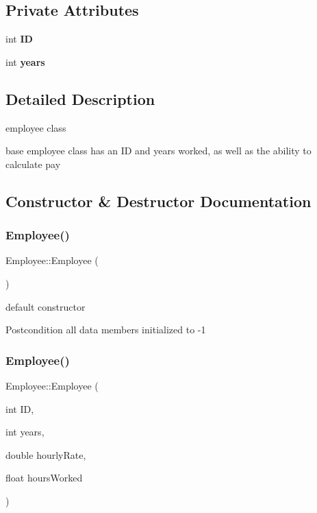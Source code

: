 \subsection*{Private Attributes}
\begin{DoxyCompactItemize}
\item 
\mbox{\label{classEmployee_a832bbae4ee8a704b917f82c4d497bbac}} 
int {\bfseries ID}
\item 
\mbox{\label{classEmployee_a3e4862d9dfc73becb459a562fa2e25f5}} 
int {\bfseries years}
\end{DoxyCompactItemize}


\subsection{Detailed Description}
employee class 

base employee class has an ID and years worked, as well as the ability to calculate pay 

\subsection{Constructor \& Destructor Documentation}
\mbox{\label{classEmployee_a003c7bd08c40924e381eb0750cbb906f}} 
\subsubsection{\texorpdfstring{Employee()}{Employee()}\hspace{0.1cm}{\footnotesize\ttfamily [1/2]}}
{\footnotesize\ttfamily Employee\+::\+Employee (\begin{DoxyParamCaption}{ }\end{DoxyParamCaption})}

default constructor

\begin{DoxyPostcond}{Postcondition}
all data members initialized to -\/1 
\end{DoxyPostcond}
\mbox{\label{classEmployee_ad0c935ef9a290a82dcf7865172c90148}} 
\subsubsection{\texorpdfstring{Employee()}{Employee()}\hspace{0.1cm}{\footnotesize\ttfamily [2/2]}}
{\footnotesize\ttfamily Employee\+::\+Employee (\begin{DoxyParamCaption}\item[{int}]{ID,  }\item[{int}]{years,  }\item[{double}]{hourly\+Rate,  }\item[{float}]{hours\+Worked }\end{DoxyParamCaption})}

